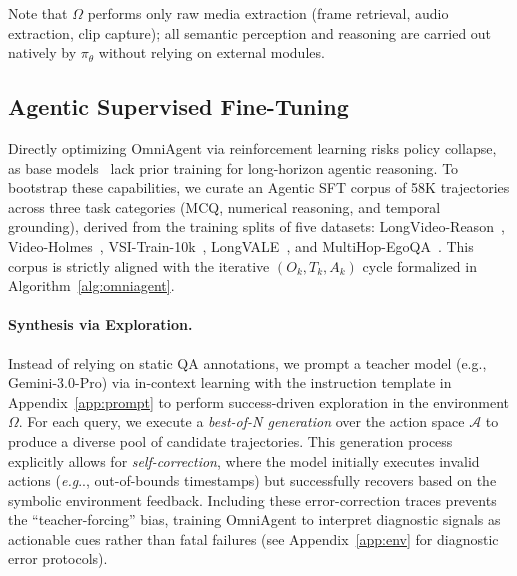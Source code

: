 \documentclass{article}
\makeatletter
\theoremstyle{plain}
\theoremstyle{definition}
\theoremstyle{remark}
\DeclareRobustCommand\onedot{\futurelet\@let@token\@onedot}
\def\@onedot{\ifx\@let@token.\else.\null\fi\xspace}
\def\eg{\textit{e.g}\onedot} \def\Eg{\textit{E.g}\onedot}
\makeatother
\begin{document}
Note that $\Omega$ performs only raw media extraction
(frame retrieval, audio extraction, clip capture); all semantic
perception and reasoning are carried out natively by $\pi_\theta$
without relying on external modules.


\subsection{Agentic Supervised Fine-Tuning}
\label{subsec:sft}

Directly optimizing OmniAgent via reinforcement learning risks policy collapse, as base models~\cite{qwen2.5omni} lack prior training for long-horizon agentic reasoning. To bootstrap these capabilities, we curate an Agentic SFT corpus of 58K trajectories across three task categories (MCQ, numerical reasoning, and temporal grounding), derived from the training splits of five datasets: LongVideo-Reason~\cite{chen2025scaling}, Video-Holmes~\cite{cheng2025video}, VSI-Train-10k~\cite{brown2025benchmark}, LongVALE~\cite{geng2025longvale}, and MultiHop-EgoQA~\cite{chen2025grounded}. This corpus is strictly aligned with the iterative $(O_k, T_k, A_k)$ cycle formalized in Algorithm~\ref{alg:omniagent}.

\paragraph{Synthesis via Exploration.}
Instead of relying on static QA annotations, we prompt a teacher model 
(e.g., Gemini-3.0-Pro)
via in-context
learning with the instruction template in
Appendix~\ref{app:prompt} to perform success-driven exploration in the environment $\Omega$. For each query, we execute a \textit{best-of-N generation} over the action space $\mathcal{A}$ to produce a diverse pool of candidate trajectories. This generation process explicitly allows for \textit{self-correction}, where the model initially executes invalid actions (\eg, out-of-bounds timestamps) but successfully recovers based on the symbolic environment feedback. Including these error-correction traces prevents the ``teacher-forcing'' bias, training OmniAgent to interpret diagnostic signals as actionable cues rather than fatal failures (see Appendix~\ref{app:env} for diagnostic error protocols).
\end{document}
